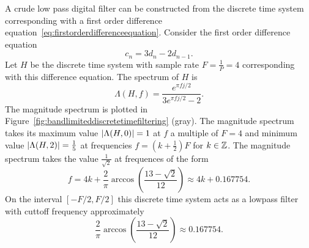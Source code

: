 A crude low pass digital filter can be constructed from the discrete time system corresponding with a first order difference equation~\eqref{eq:firstorderdifferenceequation}.  Consider the first order difference equation
\[
c_n = 3 d_n - 2 d_{n-1}.
\]
Let $H$ be the discrete time system with sample rate $F = \tfrac{1}{P} = 4$ corresponding with this difference equation.  The spectrum of $H$ is
\[
\Lambda(H,f) = \frac{e^{\pi f j/2}}{3 e^{\pi f j/2} - 2}.
\]
The magnitude spectrum is plotted in Figure~\ref{fig:bandlimiteddiscretetimefiltering} (gray).  The magnitude spectrum takes its maximum value $\left\vert \Lambda(H,0) \right\vert = 1$ at $f$ a multiple of $F = 4$ and minimum value $\left\vert \Lambda(H,2) \right\vert = \tfrac{1}{5}$ at frequencies $f = (k + \tfrac{1}{2})F$ for $k \in {\mathbb Z}$.  The magnitude spectrum takes the value $\frac{1}{\sqrt{2}}$ at frequences of the form
\[
f = 4k + \frac{2}{\pi} \arccos\left( \frac{13 - \sqrt{2}}{12} \right) \approx 4k + 0.167754.
\]
On the interval $[-F/2,F/2]$ this discrete time system acts as a lowpass filter with cuttoff frequency approximately 
\[
\frac{2}{\pi} \arccos\left( \frac{13 - \sqrt{2}}{12} \right) \approx 0.167754.
\]

